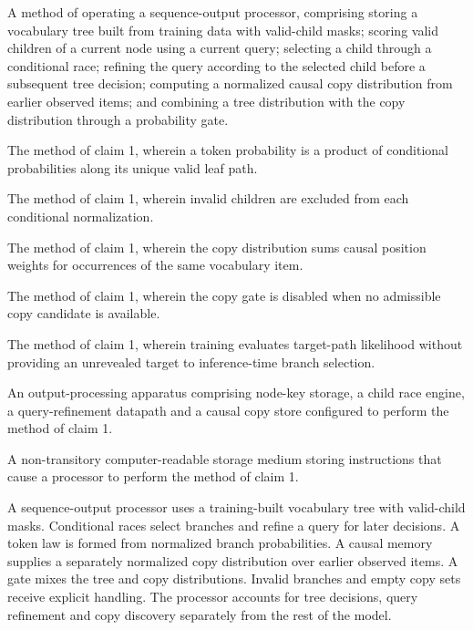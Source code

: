 \documentclass[pct]{sm-patent}
\begin{document}
\begin{patentclaims}

\item A method of operating a sequence-output processor, comprising storing a vocabulary tree built from training data with valid-child masks; scoring valid children of a current node using a current query; selecting a child through a conditional race; refining the query according to the selected child before a subsequent tree decision; computing a normalized causal copy distribution from earlier observed items; and combining a tree distribution with the copy distribution through a probability gate.

\item The method of claim 1, wherein a token probability is a product of conditional probabilities along its unique valid leaf path.

\item The method of claim 1, wherein invalid children are excluded from each conditional normalization.

\item The method of claim 1, wherein the copy distribution sums causal position weights for occurrences of the same vocabulary item.

\item The method of claim 1, wherein the copy gate is disabled when no admissible copy candidate is available.

\item The method of claim 1, wherein training evaluates target-path likelihood without providing an unrevealed target to inference-time branch selection.

\item An output-processing apparatus comprising node-key storage, a child race engine, a query-refinement datapath and a causal copy store configured to perform the method of claim 1.

\item A non-transitory computer-readable storage medium storing instructions that cause a processor to perform the method of claim 1.

\end{patentclaims}

\abstractstart

A sequence-output processor uses a training-built vocabulary tree with valid-child masks. Conditional races select branches and refine a query for later decisions. A token law is formed from normalized branch probabilities. A causal memory supplies a separately normalized copy distribution over earlier observed items. A gate mixes the tree and copy distributions. Invalid branches and empty copy sets receive explicit handling. The processor accounts for tree decisions, query refinement and copy discovery separately from the rest of the model.
\end{document}
